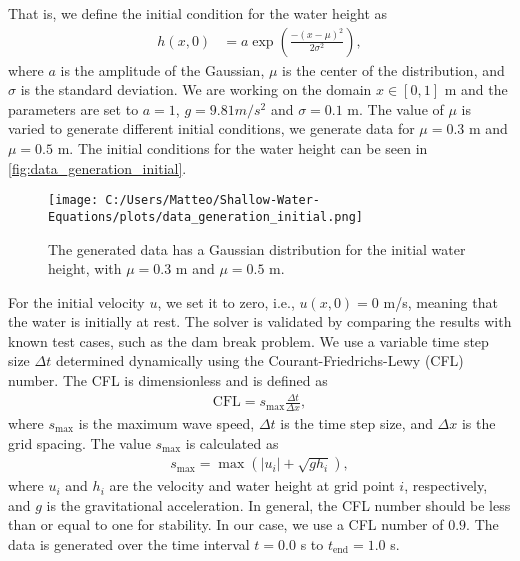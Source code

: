 That is, we define the initial condition for the water height as
\begin{align}\label{eq:1D_swe_ic_gaussian}
    h(x,0) &= a \exp{\left(\frac{-{(x-\mu)}^2}{2\sigma^2}\right)},
\end{align}
where $a$ is the amplitude of the Gaussian, $\mu$ is the center of the distribution, and $\sigma$ is the standard deviation.
We are working on the domain $x \in [0,1]$ m and the parameters are set to $a = 1$, $g = 9.81 m/s^2$ and $\sigma = 0.1$ m.
The value of $\mu$ is varied to generate different initial conditions, we generate data for $\mu = 0.3$ m and $\mu = 0.5$ m.
The initial conditions for the water height can be seen in \autoref{fig:data_generation_initial}.
\begin{figure}[H]
    \centering
    \texttt{[image: C:/Users/Matteo/Shallow-Water-Equations/plots/data\_generation\_initial.png]}
    \caption{The generated data has a Gaussian distribution for the initial water height, with $\mu = 0.3$ m and $\mu = 0.5$ m.}\label{fig:data_generation_initial}
\end{figure}
For the initial velocity $u$, we set it to zero, i.e., $u(x,0) = 0$ m/s, meaning that the water is initially at rest.
The solver is validated by comparing the results with known test cases, such as the dam break problem. 
We use a variable time step size $\Delta t$ determined dynamically using the Courant-Friedrichs-Lewy (CFL) number. 
The CFL is dimensionless and is defined as
\begin{align}\label{eq:CFL_number}
    \text{CFL} = s_{\max} \frac{\Delta t}{\Delta x},
\end{align}
where $s_{\max}$ is the maximum wave speed, $\Delta t$ is the time step size, and $\Delta x$ is the grid spacing.
The value $s_{\max}$ is calculated as 
\begin{align*}
    s_{\max} = \max \left( |u_i| + \sqrt{g h_i}  \right),
\end{align*}
where $u_i$ and $h_i$ are the velocity and water height at grid point $i$, respectively, and $g$ is the gravitational acceleration.
In general, the CFL number should be less than or equal to one for stability.
In our case, we use a CFL number of $0.9$.
The data is generated over the time interval $t = 0.0$ s to $t_{\text{end}} = 1.0$ s.

